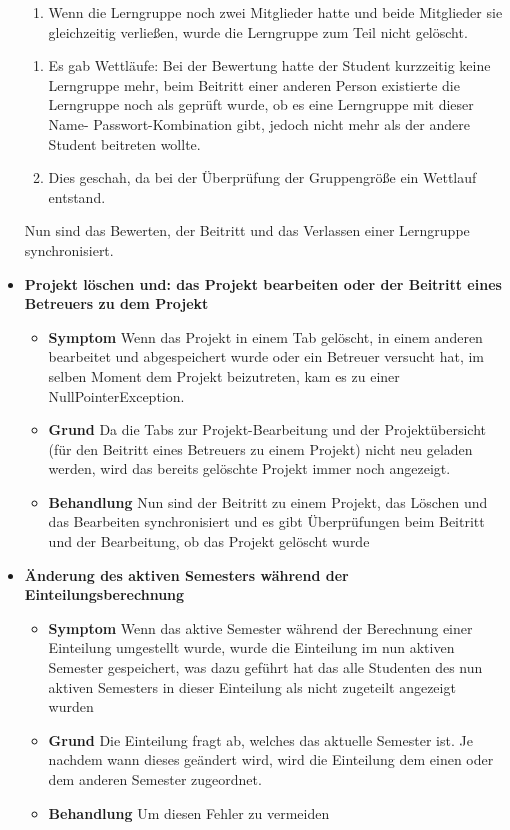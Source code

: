 \documentclass[parskip=full]{scrartcl}
\newcommand{\fehler}[4]{\textbf{#1}
 							\begin{itemize}
 							  \item \textbf{Symptom}  #2
 							  \item \textbf{Grund} #3
 							  \item \textbf{Behandlung} #4
 							\end{itemize}}
\newcommand{\code}[1]{{\ttfamily #1}}
\begin{document}
\begin{itemize}
{\begin{enumerate}
    Lerngruppe verließ und sie somit gelöscht wurde und  im selben Moment 
    Bewertungen für sie abgegeben wurden oder ein anderer Student versuchte, ihr
    beizutreten kam es teilweise zu \code{NullPointerException}s.
    \item Wenn die
    Lerngruppe noch zwei Mitglieder hatte und beide Mitglieder sie gleichzeitig
    verließen, wurde die Lerngruppe zum Teil nicht gelöscht.
    \end{enumerate}  }
    {\begin{enumerate}
      \item Es gab Wettläufe: Bei der Bewertung hatte der Student kurzzeitig
      keine Lerngruppe mehr, beim Beitritt einer anderen Person existierte die
      Lerngruppe noch als geprüft wurde, ob es eine Lerngruppe mit dieser Name-
      Passwort-Kombination gibt, jedoch nicht mehr als der andere Student
      beitreten wollte.
      \item Dies geschah, da bei der Überprüfung der Gruppengröße ein
      Wettlauf entstand.
    \end{enumerate} }{Nun sind das Bewerten, der Beitritt und das Verlassen einer Lerngruppe synchronisiert.}
    \item \fehler{Projekt löschen und: das Projekt bearbeiten oder der Beitritt
    eines Betreuers zu dem Projekt }{Wenn das Projekt in einem Tab
    gelöscht, in einem anderen bearbeitet und abgespeichert wurde oder ein
    Betreuer versucht hat, im selben Moment dem Projekt beizutreten, kam es zu
    einer \code{NullPointerException}.
    }{Da die Tabs zur Projekt-Bearbeitung und der Projektübersicht (für den
    Beitritt eines Betreuers zu einem Projekt) nicht neu geladen werden, wird
    das bereits gelöschte Projekt immer noch angezeigt.}{Nun sind der Beitritt
    zu einem Projekt, das Löschen und das Bearbeiten synchronisiert und es gibt
    Überprüfungen beim Beitritt und der Bearbeitung, ob das Projekt gelöscht
    wurde}
    \item \fehler{Änderung des aktiven Semesters während der
    Einteilungsberechnung }{Wenn das aktive Semester während der
    Berechnung einer Einteilung umgestellt wurde, wurde die Einteilung im
    nun aktiven Semester gespeichert, was dazu geführt hat das alle
    Studenten des nun aktiven Semesters in dieser Einteilung als nicht
    zugeteilt angezeigt wurden}{Die Einteilung fragt ab, welches das aktuelle
    Semester ist. Je nachdem wann dieses geändert wird, wird die Einteilung dem
    einen oder dem anderen Semester zugeordnet.}{Um diesen Fehler zu vermeiden
}
\end{itemize}
\end{document}
